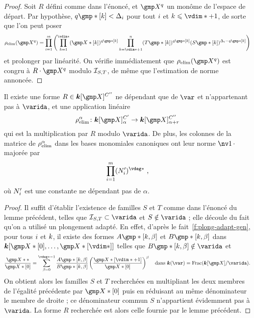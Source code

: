 \begin{proof}
  Soit \( R \) défini comme dans l'énoncé, et \( \vmp^q \) un monôme de
  l'espace de départ. Par hypothèse, \( q\mexp*[\ind] < \Delta_\fct \) pour
  tout \( i \) et \( \ind \le \vdim* + 1 \), de sorte que l'on peut poser
  \begin{equation}
    \relim( \vmp^q )
    =
    \prod\fctrange \left(
    \prod_{\ind=1}^{\vdim*}
    (\vmp*[\ind])^{q\mexp*[\ind]}
    \prod_{\ind=\vdim*+1}^n
    (T\mexp*[\ind])^{q\mexp*[\ind]}
    (S\mexp*[\ind])^{\Delta_\fct - q\mexp*[\ind]}
    \right)
  \end{equation}
  et prolonger par linéarité. On vérifie immédiatement que \( \relim(\vmp^q)
  \) est congru à \( R \cdot \vmp^q \) modulo \( \mathcal I_{S, T} \), de même
  que l'estimation de norme annoncée.
\end{proof}

\begin{coro} \label{c:hmat-relim}
  Il existe une forme \( R \in \cdn [\vmp]^{C''} \) ne dépendant que de \(
    \var \) et n'appartenant pas à \( \varida \), et une application linéaire
  \begin{equation}
    \relim^\alpha \colon
    \cdn [\vmp]_{\alpha}^{C'}
    \to
    \cdn [\vmp]_{\alpha+r}^{C''}
  \end{equation}
  qui est la multiplication par \( R \) modulo \( \varida \).  De plus, les
  colonnes de la matrice de \( \rho\sb{\mathrm{elim}}^\alpha \) dans les bases monomiales
  canoniques ont leur norme \( \nv1\truc \) majorée par
  \begin{equation}
    \prod\fctrange
    (N'_\fct)^{\vdeg*}
    \pmm,
  \end{equation}
  où \( N'_i \) est une constante ne dépendant pas de \( \alpha \).
\end{coro}

\begin{proof}
  Il suffit d'établir l'existence de familles \( S \) et \( T \) comme dans
  l'énoncé du lemme précédent, telles que \( \Ideal_{S, T} \subset \varida \)
  et \( S \notin \varida \) ;
  elle découle du fait qu'on a utilisé un plongement adapté.
  En effet, d'après le fait~\vref{f:plong-adapt-gen}, pour tous \( i \) et
  \( k \), il existe des formes \( A\mexp*[\ind, \beta] \) et \(
    B\mexp*[\ind, \beta] \) dans
  \( \cdn [ \vmp*[0], \dots, \vmp*[\vdim*] ] \) telles que \(
    B\mexp*[\ind, \beta] \notin \varida \) et
  \begin{equation}
    \frac{ \vmp** }{ \vmp*[0] }
    =
    \sum_{\beta = 0}^{\vdeg* - 1}
    \frac {A\mexp*[\ind, \beta]} {B\mexp*[\ind, \beta]}
    \left( \frac{ \vmp*[\vdim* + 1] }{ \vmp*[0] } \right) ^\beta
    \quad\text{dans \( \cdn(\var) = \mathrm{Frac}( \cdn[\vmp] / \varida ) \).}
  \end{equation}
  On obtient alors les familles \( S \) et \( T \) recherchées en multipliant
  les deux membres de l'égalité précédente par \( \vmp*[0] \) puis en
  réduisant au même dénominateur le membre de droite ; ce dénominateur commun
  \( S \) n'appartient évidemment pas à \( \varida \). La forme \( R \)
  recherchée est alors celle fournie par le lemme précédent.
\end{proof}

